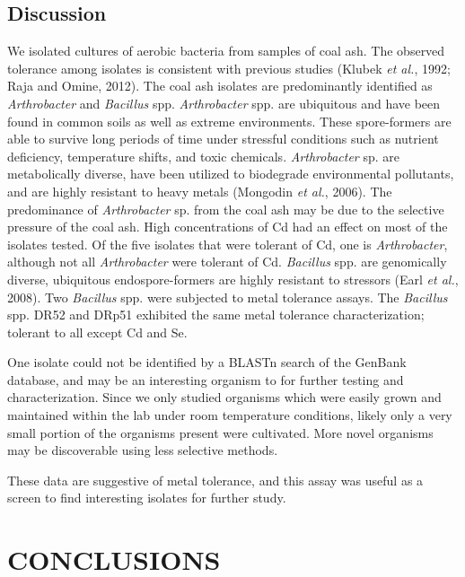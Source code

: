 \documentclass[ms, hidelinks]{uncgdissertationexp}
\theoremstyle{plain}
\theoremstyle{definition}
\theoremstyle{remark}
\begin{document}
\hypertarget{discussion-1}{%
\section{Discussion}\label{discussion-1}}
We isolated cultures of aerobic bacteria from samples of coal ash. The observed tolerance among isolates is consistent with previous studies (Klubek \emph{et al.}, 1992; Raja and Omine, 2012). The coal ash isolates are predominantly identified as \emph{Arthrobacter} and \emph{Bacillus} spp. \emph{Arthrobacter} spp. are ubiquitous and have been found in common soils as well as extreme environments. These spore-formers are able to survive long periods of time under stressful conditions such as nutrient deficiency, temperature shifts, and toxic chemicals. \emph{Arthrobacter} sp. are metabolically diverse, have been utilized to biodegrade environmental pollutants, and are highly resistant to heavy metals (Mongodin \emph{et al.}, 2006). The predominance of \emph{Arthrobacter} sp. from the coal ash may be due to the selective pressure of the coal ash. High concentrations of Cd had an effect on most of the isolates tested. Of the five isolates that were tolerant of Cd, one is \emph{Arthrobacter}, although not all \emph{Arthrobacter} were tolerant of Cd. \emph{Bacillus} spp. are genomically diverse, ubiquitous endospore-formers are highly resistant to stressors (Earl \emph{et al.}, 2008). Two \emph{Bacillus} spp. were subjected to metal tolerance assays. The \emph{Bacillus} spp. DR52 and DRp51 exhibited the same metal tolerance characterization; tolerant to all except Cd and Se.

One isolate could not be identified by a BLASTn search of the GenBank database, and may be an interesting organism to for further testing and characterization. Since we only studied organisms which were easily grown and maintained within the lab under room temperature conditions, likely only a very small portion of the organisms present were cultivated. More novel organisms may be discoverable using less selective methods.

These data are suggestive of metal tolerance, and this assay was useful as a screen to find interesting isolates for further study.

\hypertarget{conclusions}{%
\chapter{CONCLUSIONS}\label{conclusions}}
\end{document}
